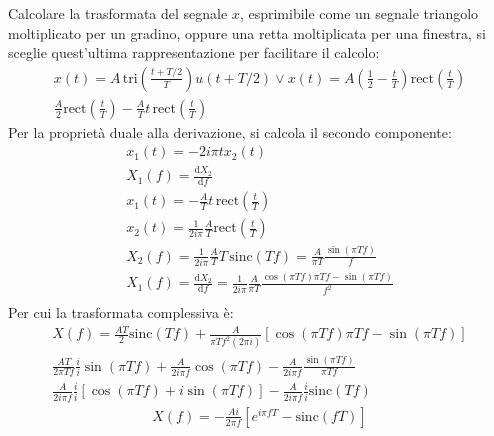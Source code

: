 \documentclass{article}
\newcommand{\rect}{\mathrm{rect}}
\newcommand{\sinc}{\mathrm{sinc}}
\newcommand{\tri}{\mathrm{tri}}
\newcommand{\df}{\mathrm{d}}
\begin{document}
Calcolare la trasformata del segnale $x$, esprimibile come un segnale triangolo moltiplicato per un gradino, oppure una retta moltiplicata per una finestra, si sceglie 
quest'ultima rappresentazione per facilitare il calcolo:
\begin{gather*}
    x(t)=A\,\displaystyle\tri \left(\frac{t+T/2}{T}\right)u(t+T/2)\lor x(t)=A\left(\frac{1}{2}-\frac{t}{T}\right)\rect\left(\frac{t}{T}\right)\\
    \displaystyle\frac{A}{2}\rect\left(\frac{t}{T}\right)-\frac{A}{T}t\,\rect\left(\frac{t}{T}\right)
\end{gather*}
Per la proprietà duale alla derivazione, si calcola il secondo componente: 
\begin{gather*}
    x_1(t)=-2i\pi tx_2(t)\\
    X_1(f)=\displaystyle\frac{\df X_2}{\df f}\\
    x_1(t)=-\displaystyle\frac{A}{T}t\,\rect\left(\frac{t}{T}\right)\\
    x_2(t)=\displaystyle\frac{1}{2i\pi}\frac{A}{T}\rect\left(\frac{t}{T}\right)\\
    X_2(f)=\displaystyle\frac{1}{2i\pi}\frac{A}{T}T\,\sinc(Tf)=\frac{A}{\pi T}\frac{\sin(\pi Tf)}{f}\\
    X_1(f)=\displaystyle\frac{\df X_2}{\df f}=\frac{1}{2i\pi}\frac{A}{\pi T}\frac{\cos(\pi Tf)\pi Tf-\sin(\pi Tf)}{f^2}\\
\end{gather*}
Per cui la trasformata complessiva è:
\begin{gather*}
    X(f)=\displaystyle\frac{AT}{2}\sinc(Tf)+\frac{A}{\pi Tf^2(2\pi i)}\left[\cos(\pi Tf)\pi Tf-\sin (\pi Tf)\right]\\
    \displaystyle\frac{AT}{2\pi Tf}\frac{i}{i}\sin(\pi Tf)+\frac{A}{2i\pi f}\cos(\pi Tf)-\frac{A}{2i\pi f}\frac{\sin(\pi Tf)}{\pi Tf}\\
    \displaystyle\frac{A}{2i\pi f}\frac{i}{i}\left[\cos(\pi Tf)+i\sin(\pi Tf)\right]-\frac{A}{2i\pi f}\frac{i}{i}\sinc( Tf)
\end{gather*}
\begin{gather}
    X(f)=\displaystyle-\frac{Ai}{2\pi f}\left[e^{i\pi fT}-\sinc(fT)\right]
\end{gather}
\end{document}
